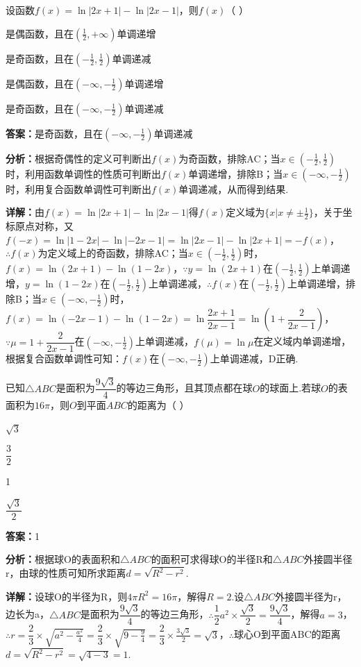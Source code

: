 \begin{question}[points=5]
设函数$f(x)=\ln|2x+1|-\ln|2x-1|$，则$f(x)$（ ）
\begin{choices}
  \item 是偶函数，且在$(\frac12,+\infty)$单调递增
  \item 是奇函数，且在$(-\frac12,\frac12)$单调递减
  \item 是偶函数，且在$(-\infty,-\frac12)$单调递增
  \item 是奇函数，且在$(-\infty,-\frac12)$单调递减
\end{choices}
\begin{solution}
\textbf{答案：}是奇函数，且在$(-\infty,-\frac12)$单调递减

\textbf{分析：}根据奇偶性的定义可判断出$f(x)$为奇函数，排除AC；当$x\in(-\frac12,\frac12)$时，利用函数单调性的性质可判断出$f(x)$单调递增，排除B；当$x\in(-\infty,-\frac12)$时，利用复合函数单调性可判断出$f(x)$单调递减，从而得到结果.

\textbf{详解：}由$f(x)=\ln|2x+1|-\ln|2x-1|$得$f(x)$定义域为$\{x|x\neq\pm\frac12\}$，关于坐标原点对称，又$f(-x)=\ln|1-2x|-\ln|-2x-1|=\ln|2x-1|-\ln|2x+1|=-f(x)$，$\therefore f(x)$为定义域上的奇函数，排除AC；当$x\in(-\frac12,\frac12)$时，$f(x)=\ln(2x+1)-\ln(1-2x)$，$\because y=\ln(2x+1)$在$(-\frac12,\frac12)$上单调递增，$y=\ln(1-2x)$在$(-\frac12,\frac12)$上单调递减，$\therefore f(x)$在$(-\frac12,\frac12)$上单调递增，排除B；当$x\in(-\infty,-\frac12)$时，$f(x)=\ln(-2x-1)-\ln(1-2x)=\ln\dfrac{2x+1}{2x-1}=\ln\left(1+\dfrac{2}{2x-1}\right)$，$\because \mu=1+\dfrac{2}{2x-1}$在$(-\infty,-\frac12)$上单调递减，$f(\mu)=\ln\mu$在定义域内单调递增，根据复合函数单调性可知：$f(x)$在$(-\infty,-\frac12)$上单调递减，D正确.
\end{solution}
\end{question}

\begin{question}[points=5]
已知$\triangle ABC$是面积为$\dfrac{9\sqrt3}{4}$的等边三角形，且其顶点都在球$O$的球面上.若球$O$的表面积为$16\pi$，则$O$到平面$ABC$的距离为（ ）
\begin{choices}
  \item $\sqrt3$
  \item $\dfrac{3}{2}$
  \item 1
  \item $\dfrac{\sqrt3}{2}$
\end{choices}
\begin{solution}
\textbf{答案：}1

\textbf{分析：}根据球O的表面积和$\triangle ABC$的面积可求得球O的半径R和$\triangle ABC$外接圆半径r，由球的性质可知所求距离$d=\sqrt{R^2-r^2}$.

\textbf{详解：}设球O的半径为R，则$4\pi R^2=16\pi$，解得$R=2$.设$\triangle ABC$外接圆半径为r，边长为a，$\triangle ABC$是面积为$\dfrac{9\sqrt3}{4}$的等边三角形，$\therefore\dfrac12 a^2\times\dfrac{\sqrt3}{2}=\dfrac{9\sqrt3}{4}$，解得$a=3$，$\therefore r=\dfrac23\times\sqrt{a^2-\frac{a^2}{4}}=\dfrac23\times\sqrt{9-\frac94}=\dfrac23\times\frac{3\sqrt3}{2}=\sqrt3$，$\therefore$球心O到平面ABC的距离$d=\sqrt{R^2-r^2}=\sqrt{4-3}=1$.
\end{solution}
\end{question}

